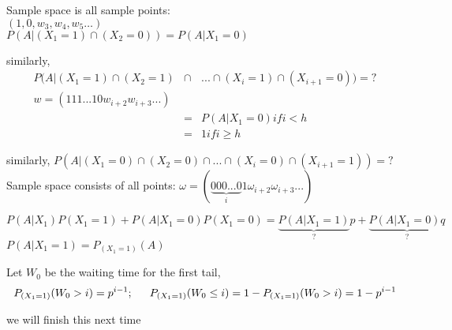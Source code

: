Sample space is all sample points: \\
$(1, 0, w_3, w_4, w_5 \ldots)$ \\
$P(A|(X_1=1) \cap (X_2=0)) = P(A|X_1=0)$

similarly,
\begin{eqnarray*}
P(A|(X_1=1) \cap (X_2=1) &\cap& ... \cap (X_i=1) \cap (X_{i+1}=0)) = ? \\
w = (111...10w_{i+2}w_{i+3}...) &&\\
&=&P(A|X_1=0) if i < h\\
&=&1 if i \geq h
\end{eqnarray*}

similarly, $P(A|(X_1=0) \cap (X_2=0) \cap ... \cap (X_i=0) \cap (X_{i+1}=1)) = ?$\\
Sample space consists of all points: $\omega=(\underbrace{000...0}_i1\omega_{i+2}\omega_{i+3}...)$

$P(A|X_1)P(X_1=1)+P(A|X_1=0)P(X_1=0)=\underbrace{P(A|X_1=1)}_?p+\underbrace{P(A|X_1=0)q}_?$\\
$P(A|X_1=1)=P_{(X_1=1)}(A)$

Let $W_0$ be the waiting time for the first tail,
\begin{displaymath} P_{(X_1=1)}(W_0>i) = p^{i-1}; \indent  P_{(X_1=1)}(W_0 \leq i) = 1-P_{(X_1=1)}(W_0>i) = 1-p^{i-1} \end{displaymath}

we will finish this next time

